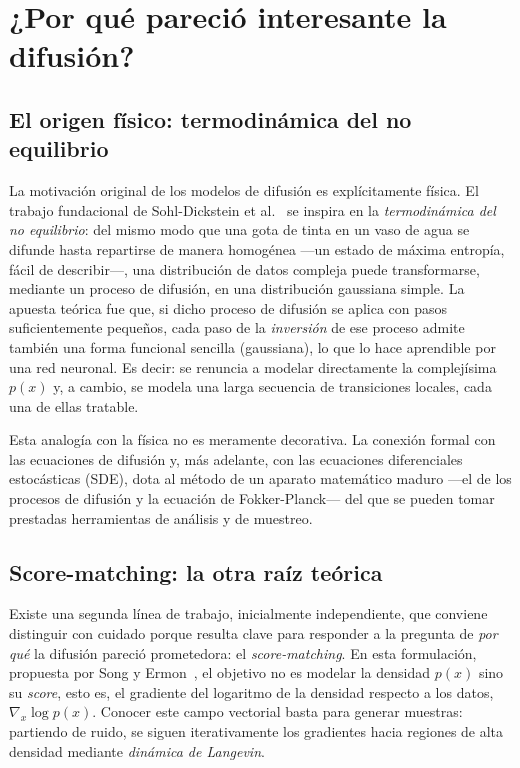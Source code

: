
\section{¿Por qué pareció interesante la difusión?}
\label{sec:por-que-difusion}

\subsection{El origen físico: termodinámica del no equilibrio}
\label{subsec:origen-fisico}

La motivación original de los modelos de difusión es explícitamente
física. El trabajo fundacional de Sohl-Dickstein et
al.~\cite{sohldickstein2015} se inspira en la \emph{termodinámica del
no equilibrio}: del mismo modo que una gota de tinta en un vaso de
agua se difunde hasta repartirse de manera homogénea —un estado de
máxima entropía, fácil de describir—, una distribución de datos
compleja puede transformarse, mediante un proceso de difusión, en una
distribución gaussiana simple. La apuesta teórica fue que, si dicho
proceso de difusión se aplica con pasos suficientemente pequeños,
cada paso de la \emph{inversión} de ese proceso admite también una
forma funcional sencilla (gaussiana), lo que lo hace aprendible por
una red neuronal. Es decir: se renuncia a modelar directamente la
complejísima $p(x)$ y, a cambio, se modela una larga secuencia de
transiciones locales, cada una de ellas tratable.

Esta analogía con la física no es meramente decorativa. La conexión
formal con las ecuaciones de difusión y, más adelante, con las
ecuaciones diferenciales estocásticas (SDE), dota al método de un
aparato matemático maduro —el de los procesos de difusión y la
ecuación de Fokker-Planck— del que se pueden tomar prestadas
herramientas de análisis y de muestreo.

\subsection{Score-matching: la otra raíz teórica}
\label{subsec:score-matching}

Existe una segunda línea de trabajo, inicialmente independiente, que
conviene distinguir con cuidado porque resulta clave para responder a
la pregunta de \emph{por qué} la difusión pareció prometedora: el
\emph{score-matching}. En esta formulación, propuesta por Song y
Ermon~\cite{song2019scorematching}, el objetivo no es modelar la
densidad $p(x)$ sino su \emph{score}, esto es, el gradiente del
logaritmo de la densidad respecto a los datos,
$\nabla_x \log p(x)$. Conocer este campo vectorial basta para generar
muestras: partiendo de ruido, se siguen iterativamente los gradientes
hacia regiones de alta densidad mediante \emph{dinámica de Langevin}.

